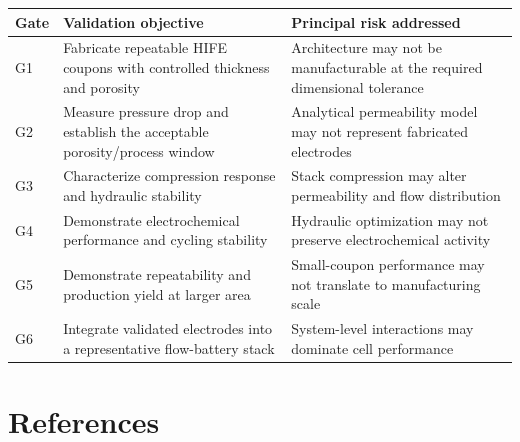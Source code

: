 \documentclass[11pt,letterpaper]{article}
\begin{document}
\begin{samepage}
\small
\begin{center}
\begin{tabularx}{\textwidth}{
    L{0.10\textwidth}
    L{0.39\textwidth}
    L{0.41\textwidth}
}
\toprule
\textbf{Gate}
&
\textbf{Validation objective}
&
\textbf{Principal risk addressed}
\\
\midrule

G1
&
Fabricate repeatable HIFE coupons with controlled thickness and porosity
&
Architecture may not be manufacturable at the required dimensional
tolerance
\\

G2
&
Measure pressure drop and establish the acceptable porosity/process window
&
Analytical permeability model may not represent fabricated electrodes
\\

G3
&
Characterize compression response and hydraulic stability
&
Stack compression may alter permeability and flow distribution
\\

G4
&
Demonstrate electrochemical performance and cycling stability
&
Hydraulic optimization may not preserve electrochemical activity
\\

G5
&
Demonstrate repeatability and production yield at larger area
&
Small-coupon performance may not translate to manufacturing scale
\\

G6
&
Integrate validated electrodes into a representative flow-battery stack
&
System-level interactions may dominate cell performance
\\

\bottomrule
\end{tabularx}
\end{center}
\normalsize
\end{samepage}


\section{References}
\end{document}
